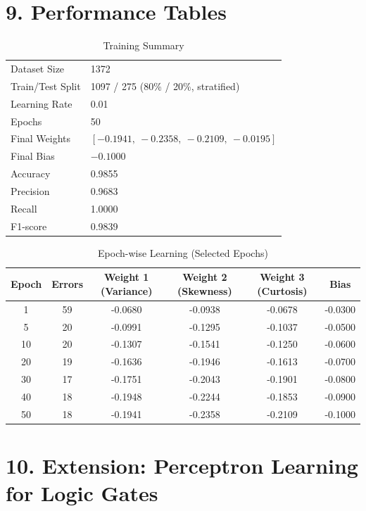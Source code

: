 \documentclass[11pt]{article}
\begin{document}

\section*{9. Performance Tables}

\begin{table}[H]
\centering
\caption{Training Summary}
\begin{tabular}{ll}
\toprule
Dataset Size & 1372 \\
Train/Test Split & 1097 / 275 (80\% / 20\%, stratified) \\
Learning Rate & 0.01 \\
Epochs & 50 \\
Final Weights & $[-0.1941,\ -0.2358,\ -0.2109,\ -0.0195]$ \\
Final Bias & $-0.1000$ \\
Accuracy & 0.9855 \\
Precision & 0.9683 \\
Recall & 1.0000 \\
F1-score & 0.9839 \\
\bottomrule
\end{tabular}
\end{table}

\begin{table}[H]
\centering
\caption{Epoch-wise Learning (Selected Epochs)}
\begin{tabular}{cccccc}
\toprule
Epoch & Errors & Weight 1 (Variance) & Weight 2 (Skewness) & Weight 3 (Curtosis) & Bias\\
\midrule
1  & 59 & -0.0680 & -0.0938 & -0.0678 & -0.0300 \\
5  & 20 & -0.0991 & -0.1295 & -0.1037 & -0.0500 \\
10 & 20 & -0.1307 & -0.1541 & -0.1250 & -0.0600 \\
20 & 19 & -0.1636 & -0.1946 & -0.1613 & -0.0700 \\
30 & 17 & -0.1751 & -0.2043 & -0.1901 & -0.0800 \\
40 & 18 & -0.1948 & -0.2244 & -0.1853 & -0.0900 \\
50 & 18 & -0.1941 & -0.2358 & -0.2109 & -0.1000 \\
\bottomrule
\end{tabular}
\end{table}


\section*{10. Extension: Perceptron Learning for Logic Gates}
\end{document}
